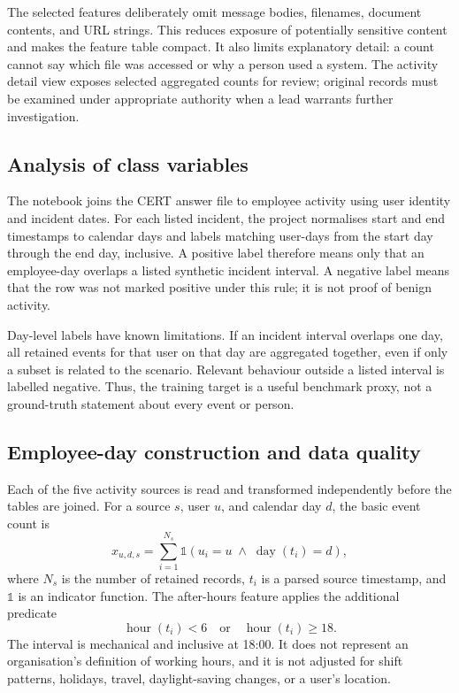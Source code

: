 The selected features deliberately omit message bodies, filenames,
document contents, and URL strings. This reduces exposure of
potentially sensitive content and makes the feature table compact. It
also limits explanatory detail: a count cannot say which file was
accessed or why a person used a system. The activity detail view
exposes selected aggregated counts for review; original records must
be examined under appropriate authority when a lead warrants further
investigation.

\subsection{Analysis of class variables}
The notebook joins the CERT answer file to employee activity using
user identity and incident dates. For each listed incident, the
project normalises start and end timestamps to calendar days and
labels matching user-days from the start day through the end day,
inclusive. A positive label therefore means only that an employee-day
overlaps a listed synthetic incident interval. A negative label means
that the row was not marked positive under this rule; it is not proof
of benign activity.

Day-level labels have known limitations. If an incident interval
overlaps one day, all retained events for that user on that day are
aggregated together, even if only a subset is related to the scenario.
Relevant behaviour outside a listed interval is labelled negative.
Thus, the training target is a useful benchmark proxy, not a
ground-truth statement about every event or person.

\subsection{Employee-day construction and data quality}
Each of the five activity sources is read and transformed independently
before the tables are joined. For a source \(s\), user \(u\), and
calendar day \(d\), the basic event count is
\[
 x_{u,d,s}=\sum_{i=1}^{N_s}
  \mathbb{1}(u_i=u\;\land\;\operatorname{day}(t_i)=d),
\]
where \(N_s\) is the number of retained records, \(t_i\) is a parsed
source timestamp, and \(\mathbb{1}\) is an indicator function. The
after-hours feature applies the additional predicate
\[
 \operatorname{hour}(t_i)<6\quad\text{or}\quad
 \operatorname{hour}(t_i)\geq18.
\]
The interval is mechanical and inclusive at 18:00. It does not
represent an organisation's definition of working hours, and it is not
adjusted for shift patterns, holidays, travel, daylight-saving changes,
or a user's location.

